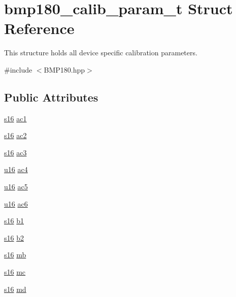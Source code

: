 \hypertarget{structbmp180__calib__param__t}{}\section{bmp180\+\_\+calib\+\_\+param\+\_\+t Struct Reference}
\label{structbmp180__calib__param__t}


This structure holds all device specific calibration parameters.  




{\ttfamily \#include $<$B\+M\+P180.\+hpp$>$}

\subsection*{Public Attributes}
\begin{DoxyCompactItemize}
\item 
\hyperlink{BMP180_8hpp_aa980e2c02ba2305e0f489d5650655425}{s16} \hyperlink{structbmp180__calib__param__t_a4af824f7ed92cef41c2e591aff2ed3ba}{ac1}
\item 
\hyperlink{BMP180_8hpp_aa980e2c02ba2305e0f489d5650655425}{s16} \hyperlink{structbmp180__calib__param__t_abe5534331e8ea703b759484322101e89}{ac2}
\item 
\hyperlink{BMP180_8hpp_aa980e2c02ba2305e0f489d5650655425}{s16} \hyperlink{structbmp180__calib__param__t_ac5563e3a7ecbf6f0a991e04d87d01dd8}{ac3}
\item 
\hyperlink{BMP180_8hpp_ace9d960e74685e2cd84b36132dbbf8aa}{u16} \hyperlink{structbmp180__calib__param__t_a4f767b1a709975522476f90f58a054f4}{ac4}
\item 
\hyperlink{BMP180_8hpp_ace9d960e74685e2cd84b36132dbbf8aa}{u16} \hyperlink{structbmp180__calib__param__t_a89e488bc5c3c6496925d64a5e42be87a}{ac5}
\item 
\hyperlink{BMP180_8hpp_ace9d960e74685e2cd84b36132dbbf8aa}{u16} \hyperlink{structbmp180__calib__param__t_a7cd1f72878db3636b302794cc067dbce}{ac6}
\item 
\hyperlink{BMP180_8hpp_aa980e2c02ba2305e0f489d5650655425}{s16} \hyperlink{structbmp180__calib__param__t_add43e571a34a76bc7e8c7e35f2b1d13d}{b1}
\item 
\hyperlink{BMP180_8hpp_aa980e2c02ba2305e0f489d5650655425}{s16} \hyperlink{structbmp180__calib__param__t_ad3e1a7249a88d8eb5ea0d37e3e5137fb}{b2}
\item 
\hyperlink{BMP180_8hpp_aa980e2c02ba2305e0f489d5650655425}{s16} \hyperlink{structbmp180__calib__param__t_a64bdabef2d55201e68ee49299b966282}{mb}
\item 
\hyperlink{BMP180_8hpp_aa980e2c02ba2305e0f489d5650655425}{s16} \hyperlink{structbmp180__calib__param__t_a5abaaaa05802e6d9b2653182e31f655d}{mc}
\item 
\hyperlink{BMP180_8hpp_aa980e2c02ba2305e0f489d5650655425}{s16} \hyperlink{structbmp180__calib__param__t_aab92deab6ac7b3bd24feda15460509c3}{md}
\end{DoxyCompactItemize}


